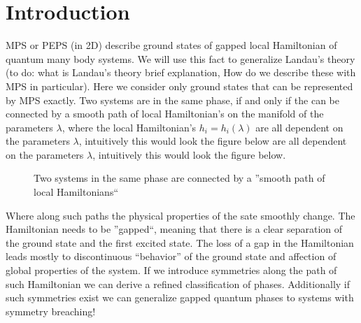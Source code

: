 


\maketitle
\tableofcontents
\section{Introduction}
MPS or PEPS (in 2D) describe ground states of gapped local Hamiltonian of
quantum many body systems. We will use this fact to generalize Landau's
theory (to do: what is Landau's theory brief explanation, How do we describe
these with MPS in particular). Here we consider only ground states that can
be represented by MPS exactly. Two systems are in the same phase, if and only
if the can be connected by a smooth path of local Hamiltonian's on the
manifold of the parameters $\lambda$, where the local Hamiltonian's $h_i =
h_i(\lambda)$ are all dependent on the parameters $\lambda$, intuitively this
would look the figure below are all dependent on the parameters $\lambda$,
intuitively this would look the figure below.

\begin{figure}[H]
    \centering
{}
\caption{Two systems in the same phase are connected by a ''smooth path of local
Hamiltonians``}
\end{figure}
Where along such paths the physical properties of the sate smoothly change.
The Hamiltonian needs to be ''gapped``, meaning that there is a clear
separation of the ground state and the first excited state. The loss of a
gap in the Hamiltonian leads mostly to discontinuous ``behavior'' of the ground
state and affection of global properties of the system. If we introduce
symmetries along the path of such Hamiltonian we can derive a refined
classification of phases. Additionally if such symmetries exist we  can
generalize gapped quantum phases to systems with symmetry breaching!
